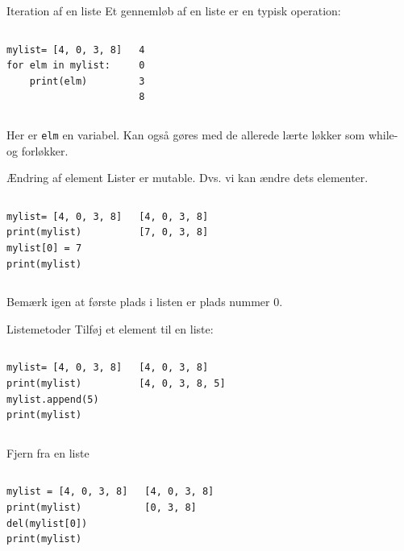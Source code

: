 \begin{frame}[fragile]{Iteration af en liste}
	Et gennemløb af en liste er en typisk operation:
	\begin{columns}
		\begin{lstlisting}[style=python]
mylist= [4, 0, 3, 8]
for elm in mylist:
	print(elm)
		\end{lstlisting}
		\begin{lstlisting}[style=python]
4
0
3
8
		\end{lstlisting}
	\end{columns}
	Her er \texttt{elm} en variabel. Kan også gøres med de allerede lærte løkker som while- og forløkker.
\end{frame}

\begin{frame}[fragile]{Ændring af element}
	Lister er mutable. Dvs. vi kan ændre dets elementer.
	\begin{columns}
		\column{0.4\textwidth}
		\begin{lstlisting}[style=python]
mylist= [4, 0, 3, 8]
print(mylist)
mylist[0] = 7
print(mylist)
		\end{lstlisting}
		\column{0.4\textwidth}
		\begin{lstlisting}[style=python]
[4, 0, 3, 8]
[7, 0, 3, 8]
		\end{lstlisting}
	\end{columns}
	Bemærk igen at første plads i listen er plads nummer 0.
\end{frame}

\begin{frame}[fragile]{Listemetoder}
	Tilføj et element til en liste:
	\begin{columns}
		\begin{lstlisting}[style=python]
mylist= [4, 0, 3, 8]
print(mylist)
mylist.append(5)
print(mylist)
		\end{lstlisting}
		\begin{lstlisting}[style=python]
[4, 0, 3, 8]
[4, 0, 3, 8, 5]
		\end{lstlisting}
	\end{columns}
	\pause
	Fjern fra en liste
	\begin{columns}
		\column{0.4\textwidth}
		\begin{lstlisting}[style=python]
mylist = [4, 0, 3, 8]
print(mylist)
del(mylist[0])
print(mylist)
		\end{lstlisting}
		\column{0.4\textwidth}
		\begin{lstlisting}[style=python]
[4, 0, 3, 8]
[0, 3, 8]
		\end{lstlisting}
	\end{columns}
\end{frame}

